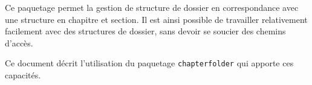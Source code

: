 %
%
%
Ce paquetage permet la gestion de structure de dossier en correspondance avec une structure en chapitre et section. Il est ainsi possible de travailler relativement facilement avec des structures de dossier, sans devoir se soucier des chemins d'acc\`es.

Ce document d\'ecrit l'utilisation du paquetage {\tt chapterfolder} qui apporte ces capacit\'es.